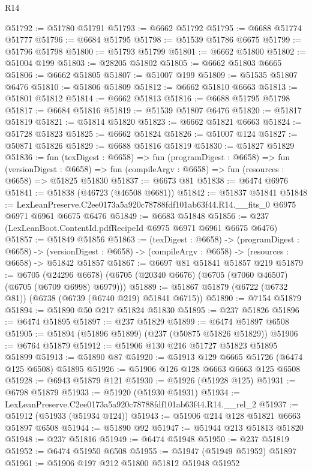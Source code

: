 \begin{lexlean}{R14}
\begin{coremodule}
@51792 := @51780 @51791
@51793 := @6662 @51792
@51795 := @6688 @51774 @51777
@51796 := @6684 @51795
@51798 := @51539 @51786 @6675
@51799 := @51796 @51798
@51800 := @51793 @51799
@51801 := @6662 @51800
@51802 := @51004 @199
@51803 := @28205 @51802
@51805 := @6662 @51803 @6665
@51806 := @6662 @51805
@51807 := @51007 @199
@51809 := @51535 @51807 @6476
@51810 := @51806 @51809
@51812 := @6662 @51810 @6663
@51813 := @51801 @51812
@51814 := @6662 @51813
@51816 := @6688 @51795 @51798
@51817 := @6684 @51816
@51819 := @51539 @51807 @6476
@51820 := @51817 @51819
@51821 := @51814 @51820
@51823 := @6662 @51821 @6663
@51824 := @51728 @51823
@51825 := @6662 @51824
@51826 := @51007 @124
@51827 := @50871 @51826
@51829 := @6688 @51816 @51819
@51830 := @51827 @51829
@51836 := fun (texDigest : @6658) =>
  fun (programDigest : @6658) =>
  fun (versionDigest : @6658) =>
  fun (compileArgv : @6658) => fun (resources : @6658) => @51825 @51830
@51837 := @6673 @81
@51838 := @6474 @6976
@51841 := @51838 (@46723 (@46508 @6681))
@51842 := @51837 @51841
@51848 := LexLeanPreserve.C2ee0173a5a920c78788fdf101ab63f44.R14.__fits_0
    @6975
    @6971
    @6961
    @6675
    @6476
@51849 := @6683 @51848
@51856 := @237 (LexLeanBoot.ContentId.pdfRecipeId @6975 @6971 @6961 @6675 @6476)
@51857 := @51849 @51856
@51863 := (texDigest : @6658) ->
  (programDigest : @6658) ->
  (versionDigest : @6658) -> (compileArgv : @6658) -> (resources : @6658) -> @51842 @51857
@51867 := @6697 @81 @51841 @51857 @219
@51879 := @6705
    (@24296 @6678)
    (@6705 (@20340 @6676) (@6705 (@7060 @46507) (@6705 (@6709 @6998) @6979)))
@51889 := @51867 @51879 (@6722 (@6732 @81)) (@6738 (@6739 (@6740 @219) @51841 @6715))
@51890 := @7154 @51879
@51894 := @51890 @50 @217 @51824 @51830
@51895 := @237 @51826
@51896 := @6474 @51895
@51897 := @237 @51829
@51899 := @6474 @51897 @6508
@51905 := @51894 (@51896 @51899) (@237 (@50875 @51826 @51829))
@51906 := @6764 @51879
@51912 := @51906 @130 @216 @51727 @51823 @51895 @51899
@51913 := @51890 @87
@51920 := @51913 @129 @6665 @51726 (@6474 @125 @6508) @51895
@51926 := @51906 @126 @128 @6663 @6663 @125 @6508
@51928 := @6943 @51879 @121
@51930 := @51926 (@51928 @125)
@51931 := @6798 @51879
@51933 := @51920 (@51930 @51931)
@51934 := LexLeanPreserve.C2ee0173a5a920c78788fdf101ab63f44.R14.__rel_2
@51937 := @51912 (@51933 (@51934 @124))
@51943 := @51906 @214 @128 @51821 @6663 @51897 @6508
@51944 := @51890 @92
@51947 := @51944 @213 @51813 @51820
@51948 := @237 @51816
@51949 := @6474 @51948
@51950 := @237 @51819
@51952 := @6474 @51950 @6508
@51955 := @51947 (@51949 @51952) @51897
@51961 := @51906 @197 @212 @51800 @51812 @51948 @51952

\end{coremodule}
\end{lexlean}
